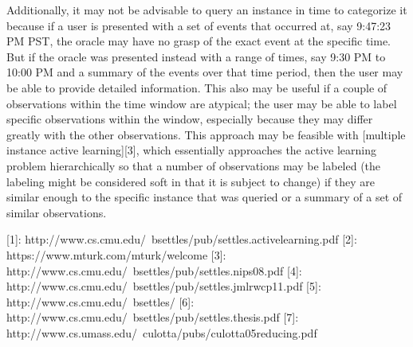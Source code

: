 \documentclass[article]{jss}
\begin{document}
Additionally, it may not be advisable to query an instance in time to categorize it because if a user is presented with a set of events that occurred at, say 9:47:23 PM PST, the oracle may have no grasp of the exact event at the specific time. But if the oracle was presented instead with a range of times, say 9:30 PM to 10:00 PM and a summary of the events over that time period, then the user may be able to provide detailed information. This also may be useful if a couple of observations within the time window are atypical; the user may be able to label specific observations within the window, especially because they may differ greatly with the other observations. This approach may be feasible with [multiple instance active learning][3], which essentially approaches the active learning problem hierarchically so that a number of observations may be labeled (the labeling might be considered soft in that it is subject to change) if they are similar enough to the specific instance that was queried or a summary of a set of similar observations.


[1]: http://www.cs.cmu.edu/~bsettles/pub/settles.activelearning.pdf
[2]: https://www.mturk.com/mturk/welcome
[3]: http://www.cs.cmu.edu/~bsettles/pub/settles.nips08.pdf 
[4]: http://www.cs.cmu.edu/~bsettles/pub/settles.jmlrwcp11.pdf
[5]: http://www.cs.cmu.edu/~bsettles/
[6]: http://www.cs.cmu.edu/~bsettles/pub/settles.thesis.pdf
[7]: http://www.cs.umass.edu/~culotta/pubs/culotta05reducing.pdf
\end{document}
